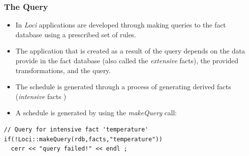 \documentclass{beamer}
\begin{document}
\begin{frame}[fragile=singleslide]\frametitle{The Query}
\begin{itemize}
\item In {\it Loci} applications are developed through making queries to the fact database using a prescribed set of rules.
\item The application that is created as a result of the query depends on the data provide in the fact database (also called the {\it extensive} facts), the provided transformations, and the query.
\item The schedule is generated through a process of generating derived facts ({\it intensive} facts )
\item A schedule is generated by using the {\it makeQuery} call:
\end{itemize}
\begin{verbatim}
// Query for intensive fact 'temperature'
if(!Loci::makeQuery(rdb,facts,"temperature")) 
  cerr << "query failed!" << endl ;
\end{verbatim}
\end{frame}
\end{document}
